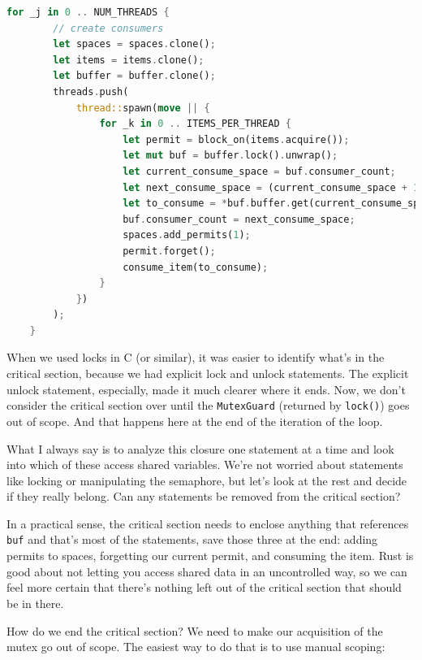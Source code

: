 \documentclass[a4paper]{report}
\begin{document}
\begin{lstlisting}[language=Rust]
    for _j in 0 .. NUM_THREADS {
        // create consumers
        let spaces = spaces.clone();
        let items = items.clone();
        let buffer = buffer.clone();
        threads.push(
            thread::spawn(move || {
                for _k in 0 .. ITEMS_PER_THREAD {
                    let permit = block_on(items.acquire());
                    let mut buf = buffer.lock().unwrap();
                    let current_consume_space = buf.consumer_count;
                    let next_consume_space = (current_consume_space + 1) % buf.buffer.len();
                    let to_consume = *buf.buffer.get(current_consume_space).unwrap();
                    buf.consumer_count = next_consume_space;
                    spaces.add_permits(1);
                    permit.forget();
                    consume_item(to_consume);
                }
            })
        );
    }

\end{lstlisting}

When we used locks in C (or similar), it was easier to identify what's in the critical section, because we had explicit lock and unlock statements. The explicit unlock statement, especially, made it much clearer where it ends. Now, we don't consider the critical section over until the \texttt{MutexGuard} (returned by \texttt{lock()}) goes out of scope. And that happens here at the end of the iteration of the loop.

What I always say is to analyze this closure one statement at a time and look into which of these access shared variables. We're not worried about statements like locking or manipulating the semaphore, but let's look at the rest and decide if they really belong. Can any statements be removed from the critical section?

In a practical sense, the critical section needs to enclose anything that references \texttt{buf} and that's most of the statements, save those three at the end: adding permits to spaces, forgetting our current permit, and consuming the item. Rust is good about not letting you access shared data in an uncontrolled way, so we can feel more certain that there's nothing left out of the critical section that should be in there.

How do we end the critical section? We need to make our acquisition of the mutex go out of scope. The easiest way to do that is to use manual scoping:
\end{document}
